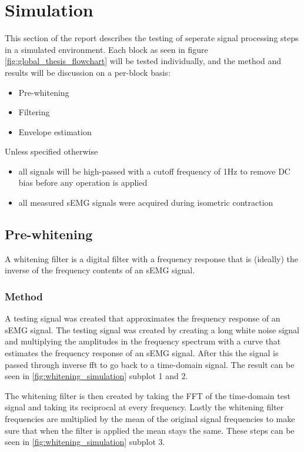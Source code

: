 \chapter{Simulation}
This section of the report describes the testing of seperate signal processing steps in a simulated environment. Each block as seen in figure \ref{fig:global_thesis_flowchart} will be tested individually, and the method and results will be discussion on a per-block basis:
\begin{itemize}
    \item Pre-whitening
    \item Filtering
    \item Envelope estimation
\end{itemize}

Unless specified otherwise
\begin{itemize}
    \item all signals will be high-passed with a cutoff frequency of 1Hz to remove DC bias before any operation is applied
    \item all measured sEMG signals were acquired during isometric contraction
\end{itemize}

\section{Pre-whitening}
A whitening filter is a digital filter with a frequency response that is (ideally) the inverse of the frequency contents of an sEMG signal. 

\subsection{Method}
A testing signal was created that approximates the frequency response of an sEMG signal. The testing signal was created by creating a long white noise signal and multiplying the amplitudes in the frequency spectrum with a curve that estimates the frequency response of an sEMG signal. After this the signal is passed through inverse fft to go back to a time-domain signal. The result can be seen in \ref{fig:whitening_simulation} subplot 1 and 2.

The whitening filter is then created by taking the FFT of the time-domain test signal and taking its reciprocal at every frequency. Lastly the whitening filter frequencies are multiplied by the mean of the original signal frequencies to make sure that when the filter is applied the mean stays the same. These steps can be seen in \ref{fig:whitening_simulation} subplot 3. 

